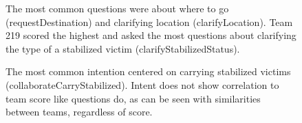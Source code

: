 \begin{figure}[h!]
    \centering
    \caption{The most common questions were about where to go (requestDestination) and clarifying location (clarifyLocation). Team 219 scored the highest and asked the most questions about clarifying the type of a stabilized victim (clarifyStabilizedStatus).}
    \end{figure}

\begin{figure}[h!]
    \centering
    \caption{The most common intention centered on carrying stabilized victims (collaborateCarryStabilized). Intent does not show correlation to team score like questions do, as can be seen with similarities between teams, regardless of score.}
    \end{figure}

